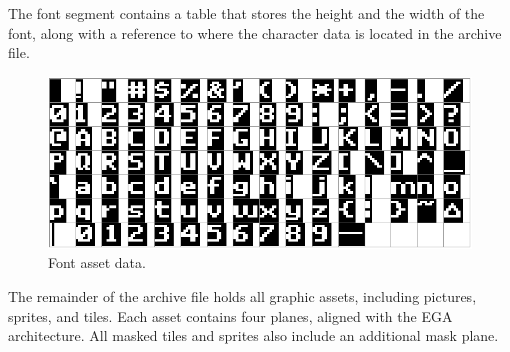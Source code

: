 \documentclass[book.tex]{subfiles}
\begin{document}
\par
The font segment contains a table that stores the height and the width of the font, along with a reference to where the character data is located in the archive file.\\


\par
\begin{minipage}{\textwidth}
 \par
 \end{minipage}


\par
\begin{figure}[H] 
  \centering 
  \includegraphics[width=1.0\textwidth]{imgs/drawings/font.eps}
  \caption{Font asset data.}
  \label{fig:font_assets}
\end{figure} 

\pagebreak
The remainder of the archive file holds all graphic assets, including pictures, sprites, and tiles. Each asset contains four planes, aligned with the EGA architecture. All masked tiles and sprites also include an additional mask plane.\\
\end{document}
